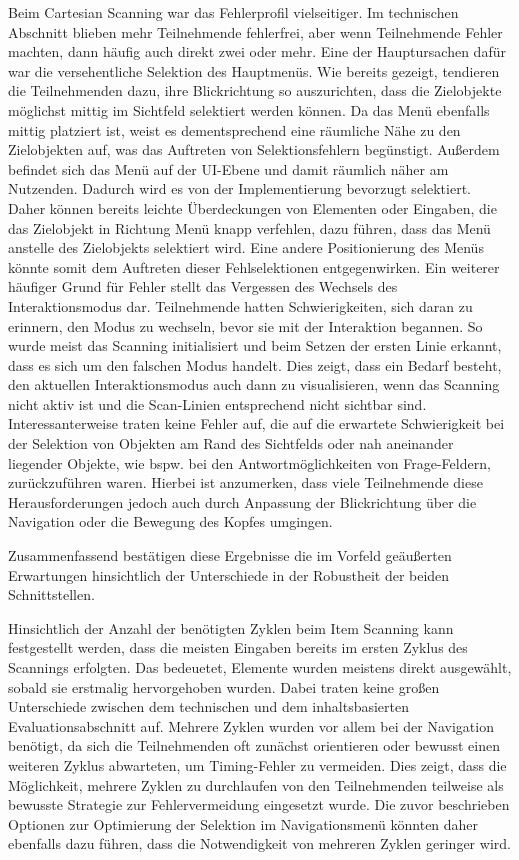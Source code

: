Beim Cartesian Scanning war das Fehlerprofil vielseitiger. Im technischen Abschnitt blieben mehr Teilnehmende fehlerfrei, aber wenn Teilnehmende Fehler machten, dann häufig auch direkt zwei oder mehr. Eine der Hauptursachen dafür war die versehentliche Selektion des Hauptmenüs. Wie bereits gezeigt, tendieren die Teilnehmenden dazu, ihre Blickrichtung so auszurichten, dass die Zielobjekte möglichst mittig im Sichtfeld selektiert werden können. Da das Menü ebenfalls mittig platziert ist, weist es dementsprechend eine räumliche Nähe zu den Zielobjekten auf, was das Auftreten von Selektionsfehlern begünstigt. Außerdem befindet sich das Menü auf der UI-Ebene und damit räumlich näher am Nutzenden. Dadurch wird es von der Implementierung bevorzugt selektiert. Daher können bereits leichte Überdeckungen von Elementen oder Eingaben, die das Zielobjekt in Richtung Menü knapp verfehlen, dazu führen, dass das Menü anstelle des Zielobjekts selektiert wird. Eine andere Positionierung des Menüs könnte somit dem Auftreten dieser Fehlselektionen entgegenwirken. 
Ein weiterer häufiger Grund für Fehler stellt das Vergessen des Wechsels des Interaktionsmodus dar. Teilnehmende hatten Schwierigkeiten, sich daran zu erinnern, den Modus zu wechseln, bevor sie mit der Interaktion begannen. So wurde meist das Scanning initialisiert und beim Setzen der ersten Linie erkannt, dass es sich um den falschen Modus handelt. Dies zeigt, dass ein Bedarf besteht, den aktuellen Interaktionsmodus auch dann zu visualisieren, wenn das Scanning nicht aktiv ist und die Scan-Linien entsprechend nicht sichtbar sind.
Interessanterweise traten keine Fehler auf, die auf die erwartete Schwierigkeit bei der Selektion von Objekten am Rand des Sichtfelds oder nah aneinander liegender Objekte, wie bspw. bei den Antwortmöglichkeiten von Frage-Feldern, zurückzuführen waren. Hierbei ist anzumerken, dass viele Teilnehmende diese Herausforderungen jedoch auch durch Anpassung der Blickrichtung über die Navigation oder die Bewegung des Kopfes umgingen. 

Zusammenfassend bestätigen diese Ergebnisse die im Vorfeld geäußerten Erwartungen hinsichtlich der Unterschiede in der Robustheit der beiden Schnittstellen.

Hinsichtlich der Anzahl der benötigten Zyklen beim Item Scanning kann festgestellt werden, dass die meisten Eingaben bereits im ersten Zyklus des Scannings erfolgten. Das bedeuetet, Elemente wurden meistens direkt ausgewählt, sobald sie erstmalig hervorgehoben wurden. Dabei traten keine großen Unterschiede zwischen dem technischen und dem inhaltsbasierten Evaluationsabschnitt auf. Mehrere Zyklen wurden vor allem bei der Navigation benötigt, da sich die Teilnehmenden oft zunächst orientieren oder bewusst einen weiteren Zyklus abwarteten, um Timing-Fehler zu vermeiden. Dies zeigt, dass die Möglichkeit, mehrere Zyklen zu durchlaufen von den Teilnehmenden teilweise als bewusste Strategie zur Fehlervermeidung eingesetzt wurde. Die zuvor beschrieben Optionen zur Optimierung der Selektion im Navigationsmenü könnten daher ebenfalls dazu führen, dass die Notwendigkeit von mehreren Zyklen geringer wird.  

